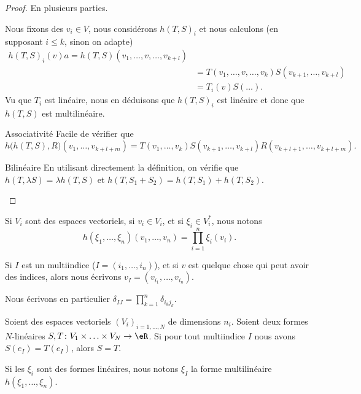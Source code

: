 \begin{proof}
	En plusieurs parties.
	\begin{subproof}
		\spitem[multilinéaire]
		Nous fixons des \( v_i\in V\), nous considérons \( h(T,S)_i\) et nous calculons (en supposant \( i\leq k\), sinon on adapte)
		\begin{subequations}
			\begin{align}
				h(T,S)_i(v)a=h(T,S)(v_1,\ldots,v,\ldots,v_{k+l})         \\
				 & = T(v_1,\ldots,v,\ldots,v_k)S(v_{k+1},\ldots,v_{k+l}) \\
				 & =T_i(v)S(\ldots).
			\end{align}
		\end{subequations}
		Vu que \( T_i\) est linéaire, nous en déduisons que \( h(T,S)_i\) est linéaire et donc que \( h(T,S)\) est multilinéaire.
		\item[Associativité]
		Facile de vérifier que
		\begin{equation}
			h\big( h(T,S),R \big)(v_1,\ldots,v_{k+l+m})=T(v_1,\ldots,v_k)S(v_{k+1},\ldots,v_{k+l})R(v_{k+l+1},\ldots,v_{k+l+m}).
		\end{equation}
		\item[Bilinéaire]
		En utilisant directement la définition, on vérifie que \( h(T,\lambda S)=\lambda h(T,S)\) et \( h(T,S_1+S_2)=h(T,S_1)+h(T,S_2)\).
	\end{subproof}
\end{proof}

\begin{normaltext}
	Si \( V_i\) sont des espaces vectoriels, si \( v_i\in V_i\), et si \( \xi_i\in V_i^*\), nous notons
	\begin{equation}
		h(\xi_1,\ldots,\xi_n)(v_1,\ldots,v_n)=\prod_{i=1}^n\xi_i(v_i).
	\end{equation}

	Si \( I\) est un multiindice (\( I=(i_1,\ldots,i_n)\)), et si \( v\) est quelque chose qui peut avoir des indices, alors nous écrivons \( v_I=(v_{i_1},\ldots, v_{i_n})\).

	Nous écrivons en particulier \( \delta_{IJ}=\prod_{k=1}^n\delta_{i_kj_k}\).
\end{normaltext}


\begin{lemma}	\label{LEMooPUNAooUnQTpJ}
	Soient des espaces vectoriels \( (V_i)_{i=1,\ldots,N}\) de dimensions \( n_i\). Soient deux formes \( N\)-linéaires \(S,T \colon V_1\times \ldots \times V_N \to \eR  \). Si pour tout multiindice \( I\) nous avons \( S(e_I)=T(e_I)\), alors \( S=T\).

	Si les \( \xi_i\) sont des formes linéaires, nous notons \( \xi_I\) la forme multilinéaire \( h(\xi_1,\ldots,\xi_n)\).
\end{lemma}


